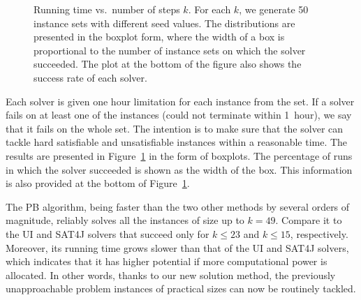 \documentclass[runningheads,proof]{llncs}
\begin{document}
\begin{figure}
\endpgfgraphicnamed
 
\caption{Running time vs.\ number of steps $k$. For each $k$, we generate 50 instance sets with different seed values.  
The distributions are presented in the boxplot form, where the width of a box is proportional to the number of instance sets on which the solver succeeded.  
The plot at the bottom of the figure also shows the success rate of each solver.}
\label{fig:change-k}
\end{figure}
Each solver is given one hour limitation for each instance from the set. 
If a solver fails on at least one of the instances (could not terminate within 1~hour), we say that it fails on the whole set.
The intention is to make sure that the solver can tackle hard satisfiable and unsatisfiable instances within a reasonable time.
The results are presented in Figure~\ref{fig:change-k} in the form of boxplots.
The percentage of runs in which the solver succeeded is shown as the width of the box.
This information is also provided at the bottom of Figure~\ref{fig:change-k}.

The PB algorithm, being faster than the two other methods by several orders of magnitude, reliably solves all the instances of size up to $k = 49$.
Compare it to the UI and SAT4J solvers that succeed only for $k \le 23$ and $k \le 15$, respectively.
Moreover, its running time grows slower than that of the UI and SAT4J solvers, which indicates that it has higher potential if more computational power is allocated.
In other words, thanks to our new solution method, the previously unapproachable problem instances of practical sizes can now be routinely tackled.
\end{document}
